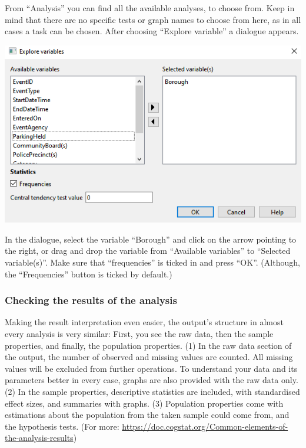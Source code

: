 \documentclass[
]{book}
\begin{document}
From ``Analysis'' you can find all the available analyses, to choose from. Keep in mind that there are no specific tests or graph names to choose from here, as in all cases a task can be chosen. After choosing ``Explore variable'' a dialogue appears.

\includegraphics{img/ch1/explorevariables.png}

In the dialogue, select the variable ``Borough'' and click on the arrow pointing to the right, or drag and drop the variable from ``Available variables'' to ``Selected variable(s)''. Make sure that ``frequencies'' is ticked in and press ``OK''. (Although, the ``Frequencies'' button is ticked by default.)

\hypertarget{checking-the-results-of-the-analysis}{%
\subsubsection{Checking the results of the analysis}\label{checking-the-results-of-the-analysis}}

Making the result interpretation even easier, the output's structure in almost every analysis is very similar: First, you see the raw data, then the sample properties, and finally, the population properties. (1) In the raw data section of the output, the number of observed and missing values are counted. All missing values will be excluded from further operations. To understand your data and its parameters better in every case, graphs are also provided with the raw data only. (2) In the sample properties, descriptive statistics are included, with standardised effect sizes, and summaries with graphs. (3) Population properties come with estimations about the population from the taken sample could come from, and the hypothesis tests. (For more: \url{https://doc.cogstat.org/Common-elements-of-the-analysis-results})
\end{document}
